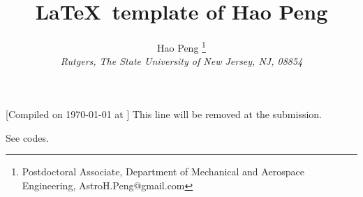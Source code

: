\documentclass[]{article}
\title{\LaTeX\ template of Hao Peng}
\author{Hao Peng%
	\thanks{Postdoctoral Associate, Department of Mechanical and Aerospace Engineering, AstroH.Peng@gmail.com}\\
	{\normalsize\itshape
		Rutgers, The State University of New Jersey, NJ, 08854}}
\date{}
\begin{document}
\maketitle

{\footnotesize  [Compiled on \today{} at \currenttime] This line will be removed at the submission.}

See codes.






\end{document}
